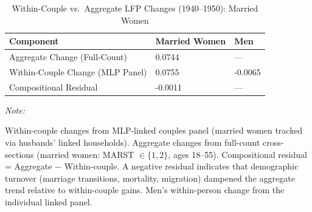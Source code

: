 \begin{table}
\centering
\caption{\label{tab:decomposition}Within-Couple vs.\ Aggregate LFP Changes (1940--1950): Married Women}
\centering
\begin{threeparttable}
\begin{tabular}[t]{lll}
\toprule
Component & Married Women & Men\\
\midrule
Aggregate Change (Full-Count) & 0.0744 & ---\\
Within-Couple Change (MLP Panel) & 0.0755 & -0.0065\\
Compositional Residual & -0.0011 & ---\\
\bottomrule
\end{tabular}
\begin{tablenotes}
\item \textit{Note: }
\item Within-couple changes from MLP-linked couples panel (married women tracked via husbands' linked households). Aggregate changes from full-count cross-sections (married women: MARST $\in \{1,2\}$, ages 18--55). Compositional residual = Aggregate $-$ Within-couple. A negative residual indicates that demographic turnover (marriage transitions, mortality, migration) dampened the aggregate trend relative to within-couple gains. Men's within-person change from the individual linked panel.
\end{tablenotes}
\end{threeparttable}
\end{table}
